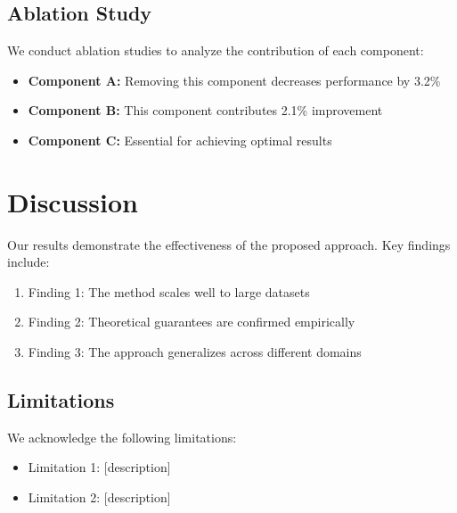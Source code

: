 \documentclass[twocolumn]{article}
\theoremstyle{definition}
\theoremstyle{remark}
\begin{document}

\subsection{Ablation Study}

We conduct ablation studies to analyze the contribution of each component:

\begin{itemize}
    \item \textbf{Component A:} Removing this component decreases performance by 3.2\%
    \item \textbf{Component B:} This component contributes 2.1\% improvement
    \item \textbf{Component C:} Essential for achieving optimal results
\end{itemize}

\section{Discussion}
\label{sec:discussion}

Our results demonstrate the effectiveness of the proposed approach. Key findings 
include:

\begin{enumerate}
    \item Finding 1: The method scales well to large datasets
    \item Finding 2: Theoretical guarantees are confirmed empirically
    \item Finding 3: The approach generalizes across different domains
\end{enumerate}

\subsection{Limitations}

We acknowledge the following limitations:
\begin{itemize}
    \item Limitation 1: [description]
    \item Limitation 2: [description]
\end{itemize}
\end{document}
